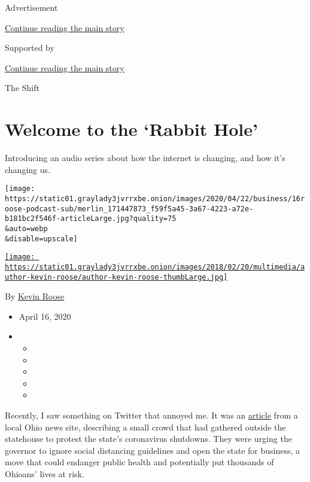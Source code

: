 Advertisement

\protect\hyperlink{after-top}{Continue reading the main story}

Supported by

\protect\hyperlink{after-sponsor}{Continue reading the main story}

The Shift

\hypertarget{welcome-to-the-rabbit-hole}{%
\section{Welcome to the `Rabbit
Hole'}\label{welcome-to-the-rabbit-hole}}

Introducing an audio series about how the internet is changing, and how
it's changing us.

\texttt{[image: https://static01.graylady3jvrrxbe.onion/images/2020/04/22/business/16roose-podcast-sub/merlin\_171447873\_f59f5a45-3a67-4223-a72e-b181bc2f546f-articleLarge.jpg?quality=75\\\&auto=webp\\\&disable=upscale]}

\href{https://www.nytimes3xbfgragh.onion/by/kevin-roose}{\texttt{[image: https://static01.graylady3jvrrxbe.onion/images/2018/02/20/multimedia/author-kevin-roose/author-kevin-roose-thumbLarge.jpg]}}

By \href{https://www.nytimes3xbfgragh.onion/by/kevin-roose}{Kevin Roose}

\begin{itemize}
\item
  April 16, 2020
\item
  \begin{itemize}
  \item
  \item
  \item
  \item
  \item
  \end{itemize}
\end{itemize}

Recently, I saw something on Twitter that annoyed me. It was an
\href{https://www.clevescene.com/scene-and-heard/archives/2020/04/14/were-not-afraid-of-any-virus-crowds-gathered-outside-of-ohio-statehouse-protesting-coronavirus-shutdowns}{article}
from a local Ohio news site, describing a small crowd that had gathered
outside the statehouse to protest the state's coronavirus shutdowns.
They were urging the governor to ignore social distancing guidelines and
open the state for business, a move that could endanger public health
and potentially put thousands of Ohioans' lives at risk.

